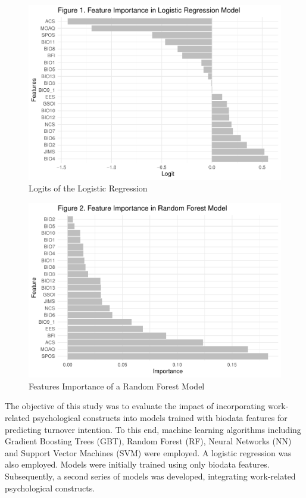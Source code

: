 \documentclass[
  man]{apa7}
\begin{document}
\begin{figure}
\centering
\includegraphics{dissertation_files/figure-latex/coefbg-1.pdf}
\caption{\label{fig:coefbg}Logits of the Logistic Regression}
\end{figure}

\begin{figure}
\centering
\includegraphics{dissertation_files/figure-latex/featuresbg-1.pdf}
\caption{\label{fig:featuresbg}Features Importance of a Random Forest Model}
\end{figure}

The objective of this study was to evaluate the impact of incorporating work-related psychological constructs into models trained with biodata features for predicting turnover intention. To this end, machine learning algorithms including Gradient Boosting Trees (GBT), Random Forest (RF), Neural Networks (NN) and Support Vector Machines (SVM) were employed. A logistic regression was also employed. Models were initially trained using only biodata features. Subsequently, a second series of models was developed, integrating work-related psychological constructs.
\end{document}
